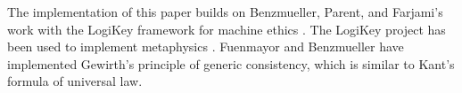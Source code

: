 \begin{isabellebody}
\begin{isamarkuptext}
The implementation of this paper builds on Benzmueller, Parent, and Farjami's work 
with the LogiKey framework for machine ethics \cite{BFP, logikey}. The LogiKey project has been used 
to implement metaphysics \cite{godel, metaphysics1}. Fuenmayor and Benzmueller \cite{gewirth} have 
implemented Gewirth's principle of generic consistency, which is similar to Kant's formula of universal law.%
\end{isamarkuptext}\isamarkuptrue%
%
\isadelimtheory
%
\endisadelimtheory
%
\isatagtheory
%
\endisatagtheory
{\isafoldtheory}%
%
\isadelimtheory
%
\endisadelimtheory
%
\end{isabellebody}%
\endinput
